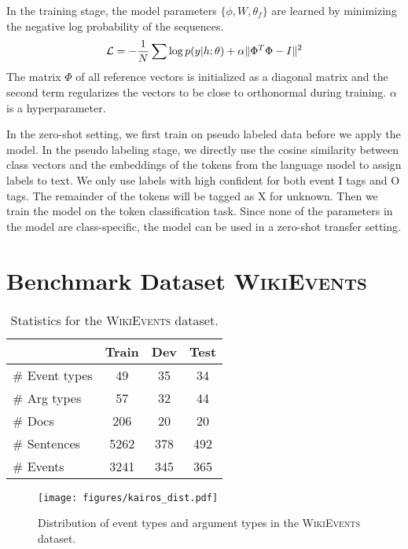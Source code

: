 In the training stage, the model parameters $\{\phi, W, \theta_f \}$ are learned by minimizing the negative log probability of the sequences.
\begin{equation}
\small 
    \mathcal{L} =  -  \frac{1}{N}\sum \log p(y| h; \theta) + \alpha \Vert \Phi^T \Phi - I \Vert^2   
\end{equation}
The matrix $\Phi$ of all reference vectors is initialized as a diagonal matrix and the second term regularizes the vectors to be close to orthonormal during training. $\alpha$ is a hyperparameter. 

In the zero-shot setting, we first train on pseudo labeled data before we apply the model. In the pseudo labeling stage, we directly use the cosine similarity between class vectors and the embeddings of the tokens from the language model to assign labels to text. We only use labels with high confident for both event I tags and O tags. The remainder of the tokens will be tagged as X for unknown.
Then we train the model on the token classification task.  Since none of the parameters in the model are class-specific, the model can be used in a zero-shot transfer setting.

\section{Benchmark Dataset \textsc{WikiEvents}}
\begin{table}[t]
    \centering
    \small 
    \begin{tabular}{l|c c c }
    \toprule 
         & Train & Dev & Test  \\
        \midrule 
         \# Event types &  49 & 35 & 34 \\
         \# Arg types & 57 & 32 & 44 \\
         \midrule 
        \# Docs  & 206 & 20 & 20 \\
        \# Sentences &  5262 & 378 & 492 \\
        \# Events & 3241 & 345 & 365 \\
        \bottomrule
    \end{tabular}
    \caption{Statistics for the \textsc{WikiEvents} dataset.}
    \vspace{-0.2cm}
    \label{tab:kairos-stats}
\end{table}
\begin{figure}
    \centering
    \texttt{[image: figures/kairos\_dist.pdf]}
    \caption{Distribution of event types and argument types in the \textsc{WikiEvents} dataset. }
    \label{fig:kairos_dist}
\end{figure}

